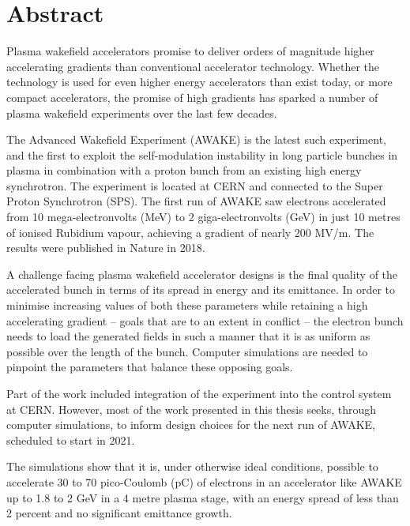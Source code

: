 \chapter*{Abstract}
\label{Abstract}

Plasma wakefield accelerators promise to deliver orders of magnitude higher accelerating gradients than conventional accelerator technology.
Whether the technology is used for even higher energy accelerators than exist today, or more compact accelerators, the promise of high gradients has sparked a number of plasma wakefield experiments over the last few decades.

The Advanced Wakefield Experiment (AWAKE) is the latest such experiment, and the first to exploit the self-modulation instability in long particle bunches in plasma in combination with a proton bunch from an existing high energy synchrotron.
The experiment is located at CERN and connected to the Super Proton Synchrotron (SPS).
The first run of AWAKE saw electrons accelerated from 10 mega-electronvolts (MeV) to 2 giga-electronvolts (GeV) in just 10 metres of ionised Rubidium vapour, achieving a gradient of nearly 200 MV/m.
The results were published in Nature in 2018.

A challenge facing plasma wakefield accelerator designs is the final quality of the accelerated bunch in terms of its spread in energy and its emittance.
In order to minimise increasing values of both these parameters while retaining a high accelerating gradient -- goals that are to an extent in conflict -- the electron bunch needs to load the generated fields in such a manner that it is as uniform as possible over the length of the bunch.
Computer simulations are needed to pinpoint the parameters that balance these opposing goals.

Part of the work included integration of the experiment into the control system at CERN. However, most of the work presented in this thesis seeks, through computer simulations, to inform design choices for the next run of AWAKE, scheduled to start in 2021. 

The simulations show that it is, under otherwise ideal conditions, possible to accelerate 30 to 70 pico-Coulomb (pC) of electrons in an accelerator like AWAKE up to 1.8 to 2 GeV in a 4 metre plasma stage, with an energy spread of less than 2 percent and no significant emittance growth.

